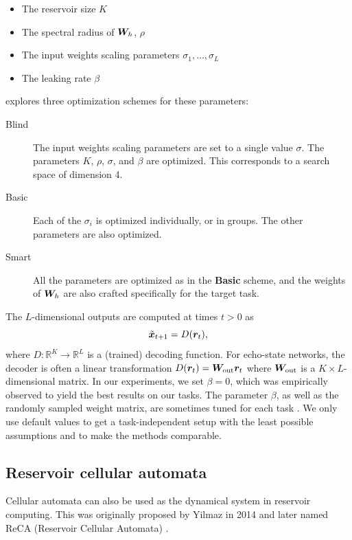 \begin{itemize}
  \item The reservoir size $K$
  \item The spectral radius of ${\bm{W}}_{h}$, $\rho$
  \item The input weights scaling parameters $\sigma_{1}, \ldots, \sigma_{L}$
  \item The leaking rate $\beta$
\end{itemize}

\textcite{jaegerLongShortTermMemory2012} explores three
optimization schemes for these parameters:
\begin{description}
  \item[Blind] The input weights scaling parameters are set to a single
        value $\sigma$. The parameters $K$, $\rho$, $\sigma$, and $\beta$ are
        optimized. This corresponds to a search space of dimension 4.
  \item[Basic] Each of the $\sigma_{i}$ is optimized individually, or in
        groups. The other parameters are also optimized.
  \item[Smart] All the parameters are optimized as in the \textbf{Basic}
        scheme, and the weights of ${\bm{W}}_{h}$ are also crafted specifically for
        the target task.
\end{description}


The $L$-dimensional outputs are computed at times $t > 0$ as
\begin{equation}
  \label{eq:esn-res}
\tilde{{\bm{x}}}_{t+ 1} = D({\bm{r}}_{t}),
\end{equation}
where $D: \mathbb{R}^{K} \rightarrow \mathbb{R}^{L}$ is a (trained) decoding
function. For echo-state networks, the decoder is often a linear transformation
$D({\bm{r}}_{t}) = {\bm{W}}_{\text{out}} {\bm{r}}_{t}$ where ${\bm{W}}_{\text{out}}$ is a
$K \times L$-dimensional matrix. In our experiments, we set $\beta = 0$, which
was empirically observed to yield the best results on our tasks. The parameter
$\beta$, as well as the randomly sampled weight matrix, are sometimes tuned for
each task \parencite{jaegerLongShortTermMemory2012}. We only use default values
to get a task-independent setup with the least possible assumptions and to make
the methods comparable.

\subsection{Reservoir cellular automata\label{sec:app-ca-res}}

Cellular automata can also be used as the dynamical system in reservoir
computing. This was originally proposed by Yilmaz in 2014 and later named ReCA
(Reservoir Cellular Automata) \autocite{yilmazReservoirComputingUsing2014,
  margemExperimentalStudyCellular2017}.

